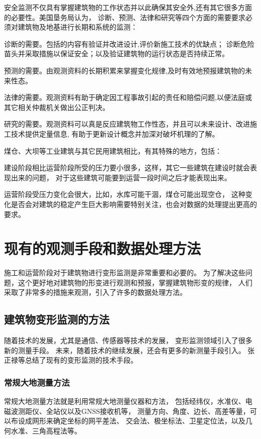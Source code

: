 安全监测不仅具有掌握建筑物的工作状态并以此确保其安全外,还有其它很多方面的必要性。美国垦务局认为，
诊断、预测、法律和研究等四个方面的需要要求必须对建筑物及地基进行长期和系统的监测：
\begin{asparaitem}[$\bullet$]
\item 诊断的需要。包括的内容有验证并改进设计,评价新施工技术的优缺点；
诊断危险苗头并采取措施以保证安全；以及验证建筑物的运行状态是否持续正常。
\item 预测的需要。由观测资料的长期积累来掌握变化规律,及时有效地预报建筑物的未来性态。
\item 法律的需要。观测资料有助于确定因工程事故引起的责任和赔偿问题,以便法庭或其它相关仲裁机关做出公正判决。
\item 研究的需要。观测资料可以真是反应建筑物工作性态，并且可以未来设计、改进施工技术提供定量信息,
有助于更新设计概念并加深对破坏机理的了解。
\end{asparaitem}

煤仓、大坝等工业建筑与其它民用建筑相比，有其特殊的地方，包括：
\begin{asparaitem}[$\bullet$]
\item 建设阶段相比运营阶段所受的压力要小很多，这样，其它一些建筑在建设时就会表现出来的问题，
对于这些建筑可能要到运营一段时间之后才能表现出来。
\item 运营阶段受压力变化会很大，比如，水库可能干涸，煤仓可能出现空仓，
这种变化是否会对建筑的稳定产生巨大影响需要特别关注，也会对数据的处理提出更高的要求。
\end{asparaitem}

\section{现有的观测手段和数据处理方法}
施工和运营阶段对于建筑物进行变形监测是非常重要和必要的。
为了解决这些问题，这个更好地对建筑物的形变进行观测和预报，掌握建筑物形变的规律，
人们采取了非常多的措施来观测，引入了许多的数据处理方法。

\subsection{建筑物变形监测的方法}
随着技术的发展，尤其是通信、传感器等技术的发展，
变形监测领域引入了很多新的测量手段。
未来，随着技术的继续发展，还会有更多的新测量手段引入。
张正禄等总结了现有的变形监测的技术手段。
\subsubsection*{常规大地测量方法}
常规大地测量方法就是利用常规大地测量仪器和方法，
包括经纬仪，水准仪、电磁波测距仪、全站仪以及GNSS接收机等，
测量方向、角度、边长、高差等量，可以布设成网形来确定坐标的网平差法、
交会法、极坐标法、卫星定位法，以及几何水准、三角高程法等。
